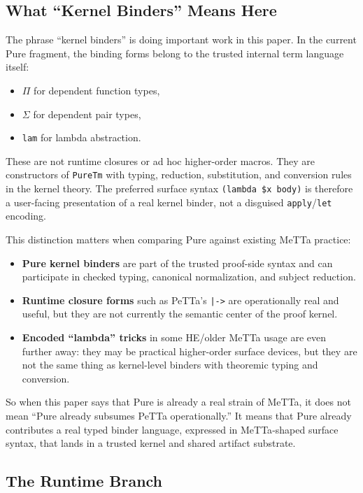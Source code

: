 \documentclass[11pt]{article}
\theoremstyle{remark}
\newcommand{\MeTTa}{\textup{MeTTa}}
\newcommand{\PeTTa}{\textup{PeTTa}}
\newcommand{\HE}{\textup{HE}}
\newcommand{\code}[1]{\texttt{#1}}
\newcommand{\leanref}[1]{\texttt{#1}}
\begin{document}
\subsection{What ``Kernel Binders'' Means Here}
\label{sec:kernel-binders}

The phrase ``kernel binders'' is doing important work in this paper. In the
current Pure fragment, the binding forms belong to the trusted internal term
language itself:
\begin{itemize}[nosep]
  \item $\Pi$ for dependent function types,
  \item $\Sigma$ for dependent pair types,
  \item \leanref{lam} for lambda abstraction.
\end{itemize}

\noindent
These are not runtime closures or ad hoc higher-order macros. They are
constructors of \leanref{PureTm} with typing, reduction, substitution, and
conversion rules in the kernel theory. The preferred surface syntax
\code{(lambda \$x body)} is therefore a user-facing presentation of a real
kernel binder, not a disguised \code{apply}/\code{let} encoding.

\noindent
This distinction matters when comparing Pure against existing \MeTTa{}
practice:
\begin{itemize}[nosep]
  \item \textbf{Pure kernel binders} are part of the trusted proof-side syntax
  and can participate in checked typing, canonical normalization, and subject
  reduction.
  \item \textbf{Runtime closure forms} such as \PeTTa{}'s \code{|->} are
  operationally real and useful, but they are not currently the semantic center
  of the proof kernel.
  \item \textbf{Encoded ``lambda'' tricks} in some \HE{}/older \MeTTa{} usage
  are even further away: they may be practical higher-order surface devices,
  but they are not the same thing as kernel-level binders with theoremic
  typing and conversion.
\end{itemize}

\noindent
So when this paper says that Pure is already a real strain of \MeTTa{}, it does
not mean ``Pure already subsumes \PeTTa{} operationally.'' It means that Pure
already contributes a real typed binder language, expressed in \MeTTa{}-shaped
surface syntax, that lands in a trusted kernel and shared artifact substrate.

\subsection{The Runtime Branch}
\label{sec:runtime-branch}
\end{document}
